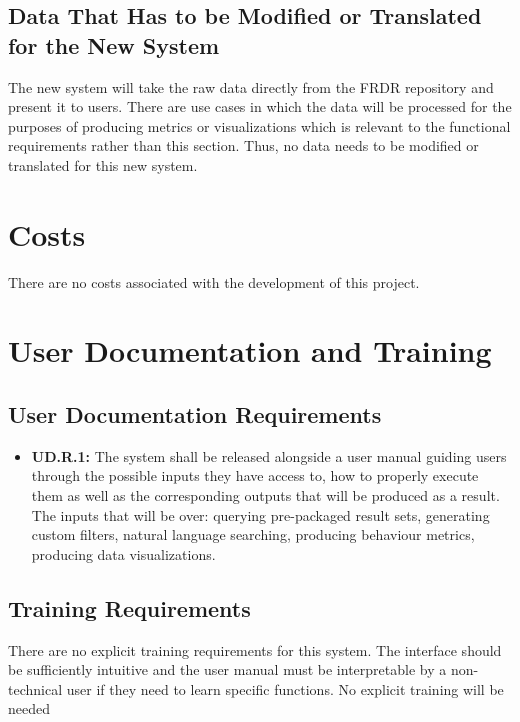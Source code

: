 \documentclass[12pt]{article}
\begin{document}
\subsection{Data That Has to be Modified or Translated for the New System}

\par{The new system will take the raw data directly from the FRDR repository and present it to users. There are use cases in which the data will be processed for the purposes 
     of producing metrics or visualizations which is relevant to the functional requirements rather than this section. Thus, no data needs to be modified or translated for this new system.}

\section{Costs}

\par{There are no costs associated with the development of this project.}

\section{User Documentation and Training}
\subsection{User Documentation Requirements}

\begin{itemize}
    \item \textbf{UD.R.1:} The system shall be released alongside a user manual guiding users through the possible inputs they have access to, how to properly execute them as well as the corresponding outputs that will be produced as a result. The inputs that 
    will be over: querying pre-packaged result sets, generating custom filters, natural language searching, producing behaviour metrics, producing data visualizations.
\end{itemize}

\subsection{Training Requirements}

\par{ There are no explicit training requirements for this system. The interface should be sufficiently intuitive and the user manual must be interpretable by a non-technical user if they need to learn specific functions.
No explicit training will be needed }
\end{document}
